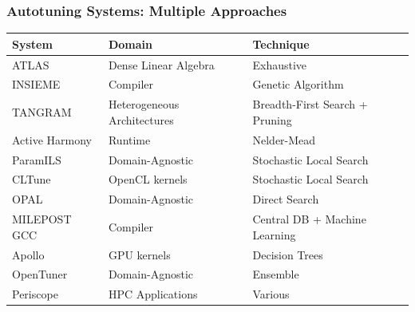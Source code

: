 \documentclass[10pt, compress, aspectratio=169]{beamer}
\begin{document}
\begin{frame}
    \frametitle{Autotuning Systems: Multiple Approaches}
    \begin{table}
        \centering
        \begin{tabular}{@{}lll@{}}
            \toprule
            System & Domain & \alert{Technique} \\ \midrule
            ATLAS & Dense Linear Algebra & Exhaustive \\ \addlinespace
            INSIEME & Compiler & Genetic Algorithm \\
            TANGRAM & Heterogeneous Architectures & Breadth-First Search + Pruning \\
            Active Harmony & Runtime & Nelder-Mead \\
            ParamILS & \alert{Domain-Agnostic} & Stochastic Local Search \\
            CLTune & OpenCL kernels & Stochastic Local Search\\
            OPAL & \alert{Domain-Agnostic} & Direct Search \\ \addlinespace
            MILEPOST GCC & Compiler & Central DB + Machine Learning \\
            Apollo & GPU kernels & Decision Trees \\ \addlinespace
            \alert{OpenTuner} & \alert{Domain-Agnostic} & Ensemble \\
            Periscope & HPC Applications & Various \\
            \bottomrule
        \end{tabular}
    \end{table}
\end{frame}
\end{document}
